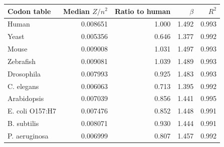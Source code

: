 \begin{tabular}{lrrrr}
\toprule
Codon table & Median $Z/n^2$ & Ratio to human & $\beta$ & $R^2$ \\
\midrule
Human & 0.008651 & 1.000 & 1.492 & 0.993 \\
Yeast & 0.005356 & 0.646 & 1.377 & 0.992 \\
Mouse & 0.009008 & 1.031 & 1.497 & 0.993 \\
Zebrafish & 0.009081 & 1.039 & 1.489 & 0.993 \\
Drosophila & 0.007993 & 0.925 & 1.483 & 0.993 \\
C. elegans & 0.006063 & 0.713 & 1.395 & 0.992 \\
Arabidopsis & 0.007039 & 0.856 & 1.441 & 0.995 \\
E. coli O157:H7 & 0.007476 & 0.852 & 1.448 & 0.991 \\
B. subtilis & 0.008071 & 0.930 & 1.444 & 0.991 \\
P. aeruginosa & 0.006999 & 0.807 & 1.457 & 0.992 \\
\bottomrule
\end{tabular}
